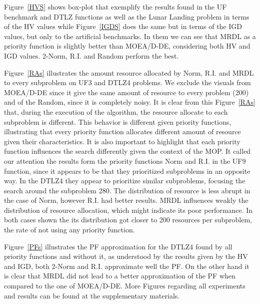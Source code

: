 Figure~\ref{HVS} shows box-plot that exemplify the results found in the UF benchmark and DTLZ functions as well as the Lunar Landing problem in terms of the HV values while Figure~\ref{IGDS} does the same but in terms of the IGD values, but only to the artificial benchmarks. In them we can see that MRDL as a priority function is slightly better than MOEA/D-DE, considering both HV and IGD values. 2-Norm, R.I. and Random perform the best.

Figure~\ref{RAs} illustrates the amount resource allocated by Norm, R.I. and MRDL to every subproblem on UF3 and DTLZ4 problems. We exclude the visuals from MOEA/D-DE since it give the same amount of resource to every problem (200) and of the Random, since it is completely noisy. It is clear from this Figure~\ref{RAs} that, during the execution of the algorithm, the resource allocate to each subproblem is different. This behavior is different given priority functions, illustrating that every priority function allocates different amount of resource given their characteristics. It is also important to highlight that each priority function influences the search differently given the context of the MOP. It called our attention the results form the priority functions Norm and R.I. in the UF9 function, since it appears to be that they prioritized subproblems in an opposite way. In the DTLZ4 they appear to prioritize similar subproblems, focusing the search around the subproblem 280. The distribution of resource is less abrupt in the case of Norm, however R.I. had better results. MRDL influences weakly the distribution of resource allocation, which might indicate its poor performance. In both cases shown the its distribution got closer to 200 resources per subproblem, the rate of not using any priority function. 

Figure~\ref{PFs} illustrates the PF approximation for the DTLZ4 found by all priority functions and without it, as understood by the results given by the HV and IGD, both 2-Norm and R.I. approximate well the PF. On the other hand it is clear that MRDL did not lead to a better approximation of the PF when compared to the one of MOEA/D-DE. More Figures regarding all experiments and results can be found at the supplementary materials.

